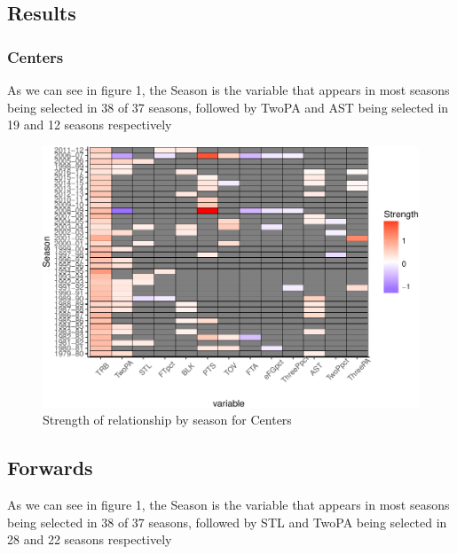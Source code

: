 \documentclass[]{elsarticle} %
\makeatletter
\def\maxwidth{\ifdim\Gin@nat@width>\linewidth\linewidth
\else\Gin@nat@width\fi}
\let\Oldincludegraphics\includegraphics
\renewcommand{\includegraphics}[1]{\Oldincludegraphics[width=\maxwidth]{#1}}
\makeatother
\begin{document}
\subsection{Results}\label{results}

\subsubsection{Centers}\label{centers}

As we can see in figure 1, the Season is the variable that appears in
most seasons being selected in 38 of 37 seasons, followed by TwoPA and
AST being selected in 19 and 12 seasons respectively

\begin{figure}[htbp]
\centering
\includegraphics{Coaching_Selection_files/figure-latex/unnamed-chunk-6-1.pdf}
\caption{Strength of relationship by season for Centers}
\end{figure}

\subsection{Forwards}\label{forwards}

As we can see in figure 1, the Season is the variable that appears in
most seasons being selected in 38 of 37 seasons, followed by STL and
TwoPA being selected in 28 and 22 seasons respectively
\end{document}
